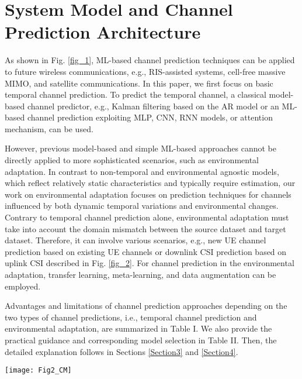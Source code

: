 \documentclass[lettersize,journal]{IEEEtran}
\begin{document}
\section{System Model and Channel Prediction Architecture}
As shown in Fig. \ref{fig_1}, ML-based channel prediction techniques can be applied to future wireless communications, e.g., RIS-assisted systems, cell-free massive MIMO, and satellite communications. In this paper, we first focus on basic temporal channel prediction. To predict the temporal channel, a classical model-based channel predictor, e.g., Kalman filtering based on the AR model or an ML-based channel prediction exploiting MLP, CNN, RNN models, or attention mechanism, can be used.

However, previous model-based and simple ML-based approaches cannot be directly applied to more sophisticated scenarios, such as environmental adaptation. %
In contrast to non-temporal and environmental agnostic models, which reflect relatively static characteristics and typically require estimation, our work on environmental adaptation focuses on prediction techniques for channels influenced by both dynamic temporal variations and environmental changes. Contrary to temporal channel prediction alone, environmental adaptation must take into account the domain mismatch between the source dataset and target dataset. Therefore, it can involve various scenarios, e.g., new UE channel prediction based on existing UE channels \cite{Kim23} or downlink CSI prediction based on uplink CSI \cite{Yang20} described in Fig. \ref{fig_2}. %
For channel prediction in the environmental adaptation, transfer learning, meta-learning, and data augmentation can be employed.

Advantages and limitations of channel prediction approaches depending on the two types of channel predictions, i.e., temporal channel prediction and environmental adaptation, are summarized in Table I. We also provide the practical guidance and corresponding model selection in Table II. Then, the detailed explanation follows in Sections \ref{Section3} and \ref{Section4}. 

\begin{figure*}[!t]
	\centering
	\texttt{[image: Fig2\_CM]}
	\caption{Environmental adaptation: New UE channel prediction and downlink CSI prediction.}
	\label{fig_2}
\end{figure*}
\end{document}
